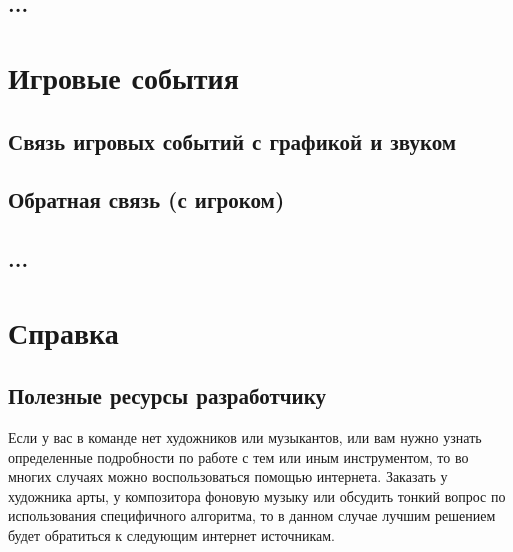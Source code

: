 \section{...}

\chapter{Игровые события}
\section{Связь игровых событий с графикой и звуком}
\section{Обратная связь (с игроком)}
\section{...}

\chapter{Справка}
\section{Полезные ресурсы разработчику}
Если у вас в команде нет художников или музыкантов, или вам нужно узнать определенные подробности по работе 
с тем или иным инструментом, то во многих случаях можно воспользоваться помощью интернета. Заказать у 
художника арты, у композитора фоновую музыку или обсудить тонкий вопрос по использования специфичного 
алгоритма, то в данном случае лучшим решением будет обратиться к следующим интернет источникам.

